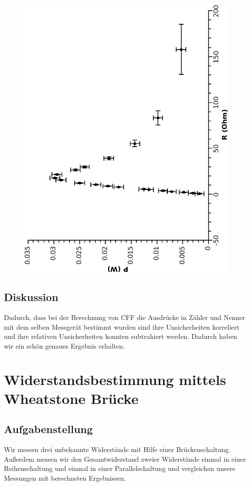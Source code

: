 \documentclass{article}
\begin{document}
\begin{center}
\begin{figure}
\includegraphics[scale=0.7,angle=-90]{leistung.eps}
\end{figure}
\end{center}
\subsection{Diskussion}
Dadurch, dass bei der Berechnung von CFF die Ausdrücke in Zähler und Nenner mit dem selben Messgerät bestimmt wurden sind ihre Unsicherheiten korreliert und ihre relativen Unsicherheiten konnten subtrahiert werden. Dadurch haben wir ein schön genaues Ergebnis erhalten.
\section{Widerstandsbestimmung mittels Wheatstone Brücke}

\subsection{Aufgabenstellung}
Wir messen drei unbekannte Widerstände mit Hilfe einer Brückenschaltung.
Außerdem messen wir den Gesamtwiderstand zweier Widerstände einmal in einer Reihenschaltung und einmal in einer Parallelschaltung und vergleichen unsere Messungen mit berechneten Ergebnissen.
\end{document}
